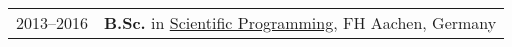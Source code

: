 \begin{longtable}[l]{@{}p{} p{}}
    2013--2016 & \textbf{B.Sc.} in \href{https://www.fh-aachen.de/en/studies/degree-programmes/applied-mathematics-and-computer-science-dual-bsc}{Scientific Programming}, FH Aachen, Germany\\



\end{longtable}
